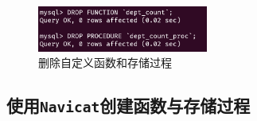 \documentclass{article}
\renewcommand\tt{\texttt}
\begin{document}
\begin{enumerate}
        \begin{figure}[H]
          \centering
          \includegraphics[width=0.5\textwidth]{img/8.png}
          \caption{删除自定义函数和存储过程}
        \end{figure}

\end{enumerate}

\subsection{使用\tt{Navicat}创建函数与存储过程}
\end{document}
